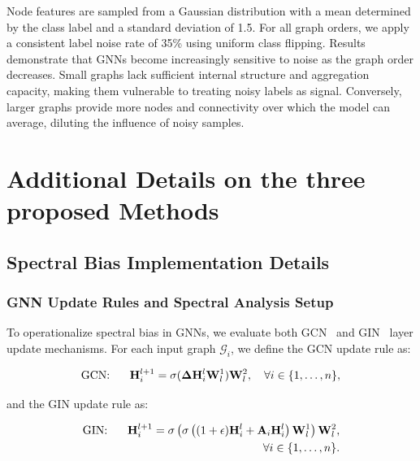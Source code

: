 {Node features are sampled from a Gaussian distribution with a mean determined by the class label and a standard deviation of 1.5. For all graph orders, we apply a consistent label noise rate of 35\% using uniform class flipping. Results demonstrate that GNNs become increasingly sensitive to noise as the graph order decreases. Small graphs lack sufficient internal structure and aggregation capacity, making them vulnerable to treating noisy labels as signal. Conversely, larger graphs provide more nodes and connectivity over which the model can average, diluting the influence of noisy samples.



\section{Additional Details on the three proposed Methods}


\subsection{Spectral Bias Implementation Details}
\label{app: weightmatrice_eigens}
\subsubsection{GNN Update Rules and Spectral Analysis Setup}

To operationalize spectral bias in GNNs, we evaluate both GCN~\citep{gcn} and GIN~\citep{WL1} layer update mechanisms. For each input graph $\mathcal{G}_i$, we define the GCN update rule as:

\begin{equation}
    \text{GCN: \hspace{0.5cm}}
    \mathbf{H}_i^{l+1} = \sigma(\mathbf{\Delta} \mathbf{H}_i^l \mathbf{W}^1_l)\mathbf{W}^2_l, \quad \forall i \in \{1, \ldots, n\},
\end{equation}

and the GIN update rule as:

\begin{equation}
\begin{aligned}
    \text{GIN: \hspace{0.5cm}} \mathbf{H}_i^{l+1} = \sigma\left( \sigma\left((1 + \epsilon)\mathbf{H}_i^l + \mathbf{A}_i \mathbf{H}_i^l \right) \mathbf{W}_l^1 \right) \mathbf{W}_l^2, \\
    \forall i \in \{1, \ldots, n\}.
\end{aligned}
\end{equation}

}
